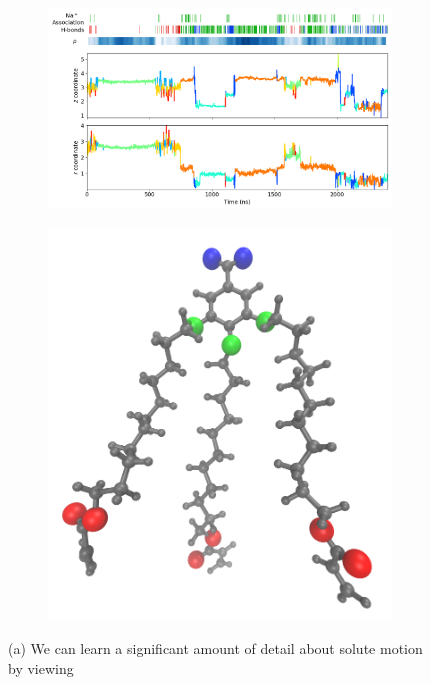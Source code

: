 \documentclass[journal=jpcbfk,manuscript=article]{achemso}
\begin{document}
  \begin{figure}
  \centering
  \begin{subfigure}{0.75\textwidth}
  \includegraphics[width=\textwidth]{mechanism_map.png}
  \caption{}
  \end{subfigure}
  \begin{subfigure}{0.24\textwidth}
  \includegraphics[width=\textwidth]{monomer_oxygens.png}
  \caption{}
  \end{subfigure}
  \caption{(a) We can learn a significant amount of detail about solute motion by viewing 
}
\end{figure}
\end{document}
